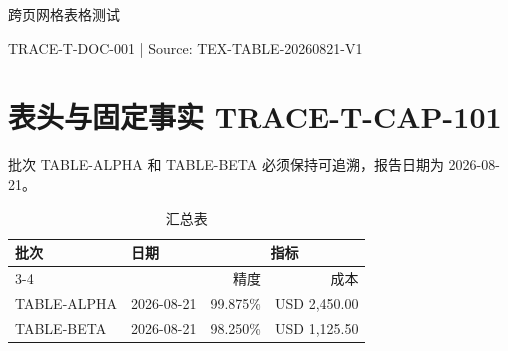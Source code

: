 \documentclass[10pt,a4paper]{ctexart}
\begin{document}
\begin{center}
{\LARGE 跨页网格表格测试}\par
{\small TRACE-T-DOC-001 | Source: TEX-TABLE-20260821-V1}
\end{center}

\section{表头与固定事实 TRACE-T-CAP-101}
批次 TABLE-ALPHA 和 TABLE-BETA 必须保持可追溯，报告日期为 2026-08-21。
\begin{table}[h]
\centering
\caption{汇总表}
\begin{tabular}{llrr}
\toprule
\multirow{2}{*}{批次} & \multirow{2}{*}{日期} & \multicolumn{2}{c}{指标}\\
\cmidrule(lr){3-4}
 & & 精度 & 成本\\
\midrule
TABLE-ALPHA & 2026-08-21 & 99.875\% & USD 2,450.00\\
TABLE-BETA & 2026-08-21 & 98.250\% & USD 1,125.50\\
\bottomrule
\end{tabular}
\end{table}
\end{document}
